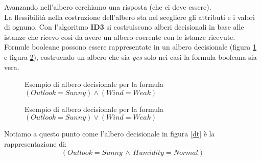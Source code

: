 Avanzando nell'albero cerchiamo una risposta (che ci deve essere).\\
La flessibilità nella costruzione dell'albero sta nel scegliere gli attributi e
i valori di ognuno. Con l'algoritmo \textbf{ID3} si costruiscono alberi
decisionali in base alle istanze che ricevo cosi da avere un albero coerente con le
istanze ricevute.\\
Formule booleane possono essere rappresentate in un albero decisionale (figura
\ref{dt2} e figura \ref{dt3}), costruendo un albero che sia \textit{yes}
solo nei casi la formula booleana 
sia vera.
\begin{figure}[H]
  \centering
  \caption{Esempio di albero decisionale per la formula $(Outlook=Sunny)\land
    (Wind=Weak)$} 
  \label{dt2}
\end{figure}
\begin{figure}[H]
  \centering
  \caption{Esempio di albero decisionale  per la formula $(Outlook=Sunny)\lor
    (Wind=Weak)$}
  \label{dt3}
\end{figure}
Notiamo a questo punto come l'albero decisionale in figura \ref{dt} è la
rappresentazione di:
\[(Outlook=Sunny\,\land\, Humidity=Normal)\]
